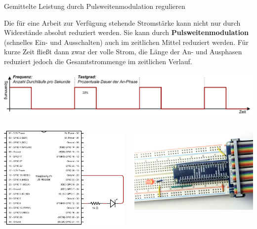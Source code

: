 {
\footnotesize

\begin{frame}{Gemittelte Leistung durch Pulsweitenmodulation regulieren}
    \parbox{\linewidth}{
        Die für eine Arbeit zur Verfügung stehende Stromstärke kann nicht nur durch Widerstände
        absolut reduziert werden. Sie kann durch \textbf{Pulsweitenmodulation} (schnelles Ein-
        und Ausschalten) auch im zeitlichen Mittel reduziert werden. Für kurze Zeit fließt dann
        zwar der volle Strom, die Länge der An- und Ausphasen reduziert jedoch die Gesamtstrommenge
        im zeitlichen Verlauf.
    }

    \begin{center}
        \includegraphics[width=.75\textwidth]{2-hardwaredesign/img/pwm}
    \end{center}

    \begin{columns}
        \includegraphics[width=.9\textwidth]{2-hardwaredesign/img/led_pwm_schaltplan}

        \includegraphics[width=\textwidth]{2-hardwaredesign/img/led_pwm_foto}
    \end{columns}
\end{frame}
}

